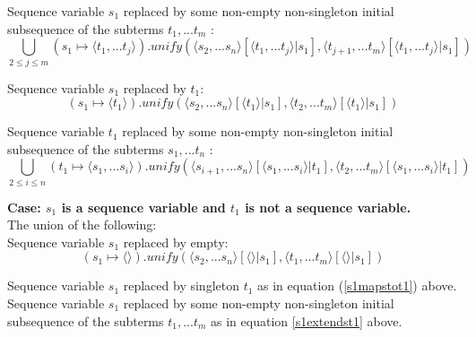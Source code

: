 \documentclass[10pt,a4paper,fleqn]{article}
\begin{document}
\noindent
Sequence variable $s_1$ replaced by some
non-empty non-singleton initial subsequence of the subterms $t_1,...t_m$ :
\begin{equation}
\label{s1extendst1}
 \bigcup_{2 \leq j \leq m}{(s_1 \mapsto \langle t_1,...t_j \rangle)
      .unify(\langle s_2,...s_n \rangle[\langle t_1,...t_j \rangle|s_1],
             \langle t_{j+1},...t_m \rangle[\langle t_1,...t_j \rangle|s_1]
						) }
\end{equation}

\noindent
Sequence variable $s_1$ replaced by $t_1$: 
\begin{equation}
 \label{s1mapstot1}
 (s_1 \mapsto \langle t_1 \rangle)
      .unify(\langle s_2,...s_n \rangle[\langle t_1 \rangle|s_1],
             \langle t_2,...t_m \rangle[\langle t_1 \rangle|s_1]
						) 
\end{equation}	

\noindent
Sequence variable $t_1$ replaced by some
non-empty non-singleton initial subsequence of the subterms $s_1,...t_n$ :
\begin{equation}
\label{t1extendss1}
 \bigcup_{2 \leq i \leq n}{(t_1 \mapsto \langle s_1,...s_i \rangle)
      .unify(\langle s_{i+1},...s_n \rangle[\langle s_1,...s_i \rangle|t_1],
             \langle t_2,...t_m \rangle[\langle s_1,...s_i \rangle|t_1]
						) }
\end{equation}



\noindent
\textbf{Case: $s_1$ is a sequence variable and $t_1$ is not a sequence variable.} \\

\noindent
The union of the following: \\

\noindent
Sequence variable $s_1$ replaced by empty:
\begin{equation}
 \label{s1empty}
 (s_1 \mapsto \langle \rangle)
      .unify(\langle s_2,...s_n \rangle[\langle \rangle|s_1],
             \langle t_1,...t_m \rangle[\langle \rangle|s_1]
						) 
\end{equation}

\noindent
Sequence variable $s_1$ replaced by singleton $t_1$  as in equation (\ref{s1mapstot1}) above. \\

\noindent
Sequence variable $s_1$ replaced by some
non-empty non-singleton initial subsequence of the subterms $t_1,...t_m$ 
as in equation \ref{s1extendst1} above. \\
\end{document}
